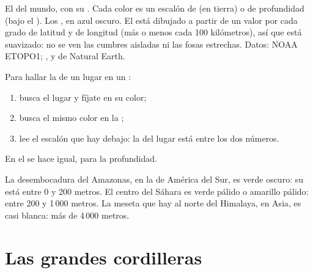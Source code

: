 \begin{omfigure}
{\small El  del mundo, con su . Cada color es un escalón
de  (en tierra) o de profundidad (bajo el ). Los , en azul
oscuro. El  está dibujado a partir de un valor por cada grado de
latitud y de longitud (más o menos cada 100 kilómetros), así que está
suavizado: no se ven las cumbres aisladas ni las fosas estrechas. Datos:
 NOAA ETOPO1; ,  y  de Natural Earth.}
\label{fig:g4:world-physical-map:map}
\end{omfigure}

\begin{method}\label{met:g4:world-physical-map:reading}
Para hallar la  de un lugar en un :
\begin{enumerate}
  \item busca el lugar y fíjate en su color;
  \item busca el mismo color en la ;
  \item lee el escalón que hay debajo: la  del lugar está entre los
        dos números.
\end{enumerate}
En el  se hace igual, para la profundidad.
\end{method}

\begin{example}\label{ex:g4:world-physical-map:three}
La desembocadura del Amazonas, en la  de América del Sur, es verde
oscuro: su  está entre 0 y 200 metros. El centro del Sáhara es verde
pálido o amarillo pálido: entre 200 y 1\,000 metros. La meseta que hay al
norte del Himalaya, en Asia, es casi blanca: más de 4\,000 metros.
\end{example}

\section{Las grandes cordilleras}

